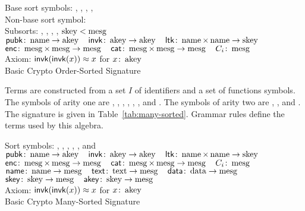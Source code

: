 \documentclass[12pt]{report}
\theoremstyle{definition}
\begin{document}
\begin{table}
\begin{center}
Base sort symbols: , , , ,
\\
Non-base sort symbol:  \\[1ex]
Subsorts: , , , ,
$\dom{skey}<\dom{mesg}$\\[1ex]
$\cn{pubk}\colon\dom{name}\rightarrow\dom{akey}\quad
\cn{invk}\colon\dom{akey}\rightarrow\dom{akey}\quad
\cn{ltk}\colon\dom{name}\times\dom{name}\rightarrow\dom{skey}$\\
$\cn{enc}\colon\dom{mesg}
\times\dom{mesg}\rightarrow\dom{mesg}\quad
\cn{cat}\colon\dom{mesg}
\times\dom{mesg}\rightarrow\dom{mesg}\quad C_i\colon\dom{mesg}$\\[1ex]
Axiom: $\cn{invk}(\cn{invk}(x))\approx x$ for $x\colon\dom{akey}$\\
\caption{Basic Crypto Order-Sorted Signature}\label{tab:order-sorted}
\end{center}
\end{table}

Terms are constructed from a set $I$ of identifiers
and a set of functions symbols.  The symbols of arity one are
, , , , , , and
.  The symbols of arity two are , , and
.  The signature is given in Table~\ref{tab:many-sorted}.
Grammar rules define the terms used by this algebra.

\begin{table}
\begin{center}
Sort symbols: , , ,
, , and \\[1ex]
$\cn{pubk}\colon\dom{name}\rightarrow\dom{akey}\quad
\cn{invk}\colon\dom{akey}\rightarrow\dom{akey}\quad
\cn{ltk}\colon\dom{name}\times\dom{name}\rightarrow\dom{skey}$\\
$\cn{enc}\colon\dom{mesg}
\times\dom{mesg}\rightarrow\dom{mesg}\quad
\cn{cat}\colon\dom{mesg}
\times\dom{mesg}\rightarrow\dom{mesg}\quad C_i\colon\dom{mesg}$\\
$\cn{name}\colon\dom{name}\rightarrow\dom{mesg}\quad
\cn{text}\colon\dom{text}\rightarrow\dom{mesg}\quad
\cn{data}\colon\dom{data}\rightarrow\dom{mesg}$\\
$\cn{skey}\colon\dom{skey}\rightarrow\dom{mesg}\quad
\cn{akey}\colon\dom{skey}\rightarrow\dom{mesg}$\\[1ex]
Axiom: $\cn{invk}(\cn{invk}(x))\approx x$ for $x\colon\dom{akey}$\\
\caption{Basic Crypto Many-Sorted Signature}\label{tab:many-sorted}
\end{center}
\end{table}
\end{document}
